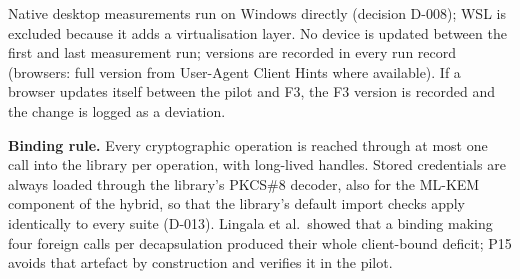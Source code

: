 \documentclass[11pt,a4paper]{article}
\begin{document}
Native desktop measurements run on Windows directly (decision D-008); WSL is excluded because it adds a virtualisation layer. No device is updated between the first and last measurement run; versions are recorded in every run record (browsers: full version from User-Agent Client Hints where available). If a browser updates itself between the pilot and F3, the F3 version is recorded and the change is logged as a deviation.

\textbf{Binding rule.} Every cryptographic operation is reached through at most one call into the library per operation, with long-lived handles. Stored credentials are always loaded through the library's PKCS\#8 decoder, also for the ML-KEM component of the hybrid, so that the library's default import checks apply identically to every suite (D-013). Lingala et al.\ showed that a binding making four foreign calls per decapsulation produced their whole client-bound deficit; P15 avoids that artefact by construction and verifies it in the pilot.

\end{document}
